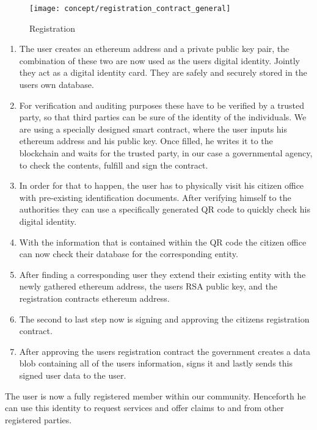 \begin{figure}[ht]
\centering
\texttt{[image: concept/registration\_contract\_general]}
\caption{Registration}
\label{fig:registration_concept}
\end{figure}

\begin{enumerate}
\item \label{registrar_item_one}
The user creates an ethereum address and a private public key pair, the combination of these two are now used as the users digital identity. Jointly they act as a digital identity card. They are safely and securely stored in the users own database.
\item \label{registrar_item_two}
For verification and auditing purposes these have to be verified by a trusted party, so that third parties can be sure of the identity of the individuals.
We are using a specially designed smart contract, where the user inputs his ethereum address and his public key. Once filled, he writes it to the blockchain and waits for the trusted party, in our case a governmental agency, to check the contents, fulfill and sign the contract.
\item \label{registrar_item_three}
In order for that to happen, the user has to physically visit his citizen office with pre-existing identification documents. After verifying himself to the authorities they can use a specifically generated QR code to quickly check his digital identity.
\item \label{registrar_item_four}
With the information that is contained within the QR code the citizen office can now check their database for the corresponding entity.
\item \label{registrar_item_five}
After finding a corresponding user they extend their existing entity with the newly gathered ethereum address, the users RSA public key, and the registration contracts ethereum address.
\item \label{registrar_item_six}
The second to last step now is signing and approving the citizens registration contract.
\item \label{registrar_item_seven}
After approving the users registration contract the government creates a data blob containing all of the users information, signs it and lastly sends this signed user data to the user.
\end{enumerate}
The user is now a fully registered member within our community. Henceforth he can use this identity to request services and offer claims to and from other registered parties. 

